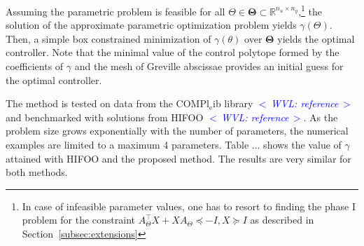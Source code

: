 \documentclass{article}
\DeclareMathOperator*{\minimize}{minimize}
\DeclareMathOperator*{\subj}{subject\;to}
\newcommand{\commentWVL}[1]{\noindent \textcolor{blue}{\emph{$<\,$WVL: #1$\,>$}}}%
\newcommand{\R}{\mathbb{R}}         %
\renewcommand{\t}{\intercal}        %
\newcommand{\feas}{\mathrm{f}}              %
\newcommand{\ppar}{\theta}                          %
\newcommand{\Ppar}{{\bm{\theta}}}                   %
\newcommand{\pPar}{\Theta}                          %
\newcommand{\PPar}{{\bm{\Theta}}}                   %
\newcommand{\Pfeas}{\Ppar^\Pi_\feas}                %
\begin{document}
Assuming the parametric problem is feasible for all $\pPar \in \PPar \subset
\R ^{n_u \times n_y}$,\footnote {In case of infeasible parameter values, one
has to resort to finding the phase I problem for the constraint $A_\pPar^\t X
+ X A_\pPar \preceq -I, X \succeq I$ as described in
Section~\ref{subsec:extensions}} the solution of the approximate parametric
optimization problem yields $\gamma (\pPar)$. Then, a simple box constrained
minimization of $\gamma(\theta)$ over $\PPar$ yields the optimal controller.
Note that the minimal value of the control polytope formed by the
coefficients of $\gamma$ and the mesh of Greville abscissae provides an
initial guess for the optimal controller.

The method is tested on data from the COMPl$_\text{e}$ib library
\commentWVL{ reference} and benchmarked with solutions from HIFOO
\commentWVL{reference}. As the problem size grows exponentially with the number of
parameters, the numerical examples are limited to a maximum 4 parameters. Table
... shows the value of $\gamma$ attained with HIFOO and the proposed method.
The results are very similar for both methods.




\end{document}
